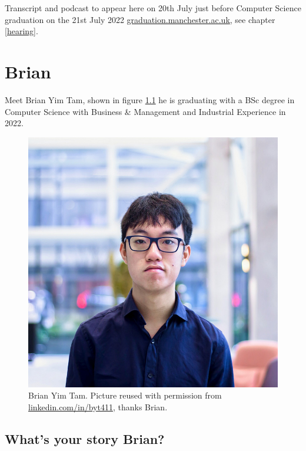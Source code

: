 \documentclass[
]{book}
\begin{document}
Transcript and podcast to appear here on 20th July just before Computer Science graduation on the 21st July 2022 \href{http://www.graduation.manchester.ac.uk/}{graduation.manchester.ac.uk}, see chapter \ref{hearing}.

\hypertarget{brian}{%
\chapter{Brian}\label{brian}}

Meet Brian Yim Tam, shown in figure \ref{fig:brian-fig} he is graduating with a BSc degree in Computer Science with Business \& Management and Industrial Experience in 2022.

\begin{figure}

{\centering \includegraphics[width=1\linewidth]{images/brian} 

}

\caption{Brian Yim Tam. Picture reused with permission from \href{hhttps://www.linkedin.com/in/byt411/}{linkedin.com/in/byt411}, thanks Brian.}\label{fig:brian-fig}
\end{figure}



\hypertarget{brian-story}{%
\section{What's your story Brian?}\label{brian-story}}
\end{document}
